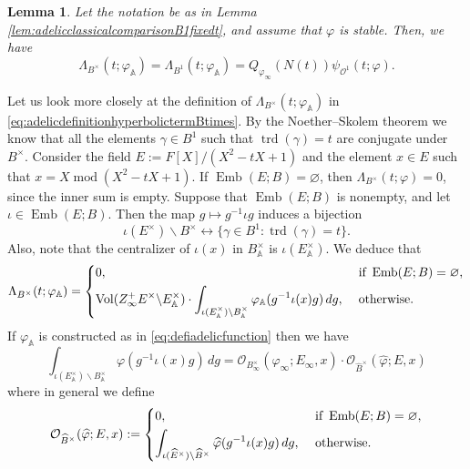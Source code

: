 \documentclass{article}
\newtheorem{lem}{Lemma}[section]
\theoremstyle{named}
\newcommand{\A}{\mathbb{A}}
\renewcommand{\O}{\mathcal{O}}
\DeclareMathOperator{\vol}{Vol}
\DeclareMathOperator{\modulo}{mod}
\DeclareMathOperator{\Emb}{Emb}
\DeclareMathOperator{\trd}{trd}
\begin{document}
\begin{lem}\label{lem:adelicclassicalcomparisonBtimesfixedt}
Let the notation be as in Lemma \ref{lem:adelicclassicalcomparisonB1fixedt}, and assume that $\varphi$ is stable. Then, we have
\begin{equation*}
    \Lambda_{B^\times}(t; \varphi_\A) = \Lambda_{B^1}(t; \varphi_\A) = Q_{\varphi_\infty}(N(t))\psi_{\O^1}(t; \varphi).
\end{equation*}
\end{lem}

Let us look more closely at the definition of $\Lambda_{B^\times}(t; \varphi_\A)$ in \eqref{eq:adelicdefinitionhyperbolictermBtimes}. By the Noether--Skolem theorem we know that all the elements $\gamma \in B^1$ such that $\trd(\gamma) = t$ are conjugate under $B^\times$. Consider the field $E := F[X]/(X^2 - tX + 1)$ and the element $x \in E$ such that $x = X \modulo (X^2 - tX + 1)$. If $\Emb(E; B) = \varnothing$, then $\Lambda_{B^\times}(t; \varphi) = 0$, since the inner sum is empty. Suppose that $\Emb(E; B)$ is nonempty, and let $\iota \in \Emb(E; B)$. Then the map $g \mapsto g^{-1}\iota g$ induces a bijection
\begin{equation*}
    \iota(E^\times)\backslash B^\times \longleftrightarrow \{\gamma \in B^1: \trd(\gamma) = t\}.
\end{equation*} 
Also, note that the centralizer of $\iota(x)$ in $B_\A^\times$ is $\iota(E_\A^\times)$. We deduce that 
\begin{equation*}
    \Lambda_{B^\times}(t; \varphi_\A) = \begin{dcases}
    0, & \text{ if }\Emb(E; B) = \varnothing,\\
    \vol(Z_\infty^+ E^\times \backslash E_\A^\times) \cdot \int_{\iota(E_\A^\times)\backslash B_\A^\times} \varphi_\A(g^{-1}\iota(x)g) \, dg, & \text{ otherwise}.\end{dcases} 
\end{equation*}
If $\varphi_\A$ is constructed as in \eqref{eq:defiadelicfunction} then we have
\begin{equation*}
    \int_{\iota(E_\A^\times)\backslash B_\A^\times} \varphi(g^{-1}\iota(x)g) \, dg = \O_{B_\infty^\times}(\varphi_\infty; E_\infty, x) \cdot \O_{\widehat{B}^\times}(\widehat{\varphi}; E, x)
\end{equation*}
where in general we define
\begin{equation}\label{eq:defifinitepartorbitalintegral}
\O_{\widehat{B}^\times}(\widehat{\varphi}; E, x) := \begin{dcases}
    0, & \text{ if }\Emb(E; B) = \varnothing,\\
    \int_{\iota(\widehat{E}^\times)\backslash \widehat{B}^\times} \widehat{\varphi}(g^{-1}\iota(x)g) \, dg, & \text{ otherwise}.
\end{dcases}
\end{equation}
\end{document}
